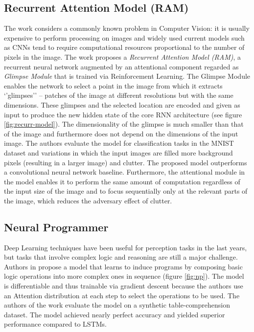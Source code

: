 \documentclass[12pt]{article}
\begin{document}
\subsection{Recurrent Attention Model (RAM)}
The work \cite{ref:rec-models} considers a commonly known problem in Computer Vision: it is usually
expensive to perform processing on images and widely used current models such as
CNNs tend to require computational resources proportional to the number of pixels in the image.
The work proposes a \emph{Recurrent Attention Model (RAM)}, a recurrent neural network augmented by
an attentional component regarded as \emph{Glimpse Module} that is trained via Reinforcement Learning.
The Glimpse Module enables the network to select a point in the image from which it extracts `'glimpses''
-- patches of the image at different resolutions but with the same dimensions.
These glimpses and the selected location are encoded and given as input to produce
the new hidden state of the core RNN architecture (see figure \ref{fig:recurr-model}).
The dimensionality of the glimpse is much smaller than that of the image and furthermore does not depend
on the dimensions of the input image.
The authors evaluate the model for classification tasks in the MNIST~\cite{ref:mnist} dataset and variations
in which the input images are filled more background pixels (resulting in a larger image) and clutter.
The proposed model outperforms a convolutional neural network baseline.
Furthermore, the attentional module in the model enables it to perform the same amount of computation
regardless of the input size of the image and to focus sequentially only at the relevant parts of the image,
which reduces the adversary effect of clutter.

\subsection{Neural Programmer}
Deep Learning techniques have been useful for perception tasks in the last years, but tasks that involve
complex logic and reasoning are still a major challenge.
Authors in \cite{ref:np} propose a model that learns to induce programs by composing basic logic operations
into more complex ones in sequence (figure \ref{fig:np}).
The model is differentiable and thus trainable via gradient descent because the authors use an Attention
distribution at each step to select the operations to be used.
The authors of the work evaluate the model on a synthetic table-comprehension dataset.
The model achieved nearly perfect accuracy and yielded superior performance compared to LSTMs.
\end{document}
